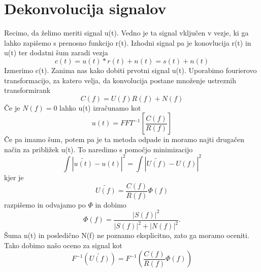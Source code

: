 \documentclass[11pt, a4paper]{article}
\begin{document}
\section{Dekonvolucija signalov}
Recimo, da želimo meriti signal u(t). Vedno je ta signal vključen v vezje, ki ga lahko zapišemo s prenosno funkcijo r(t). Izhodni signal pa je konovlucija r(t) in u(t) ter dodatni šum zaradi vezja
\begin{equation}
c(t) = u(t) * r(t) + n(t) = s(t) + n(t)
\end{equation}
Izmerimo c(t). Zanima nas kako dobiti prvotni signal u(t). Uporabimo fourierovo transformacijo, za katero velja, da konvolucija postane množenje ustreznih transformirank
\begin{equation}
C(f) = U(f) R(f) + N(f)
\end{equation}
Če je $N(f) = 0$ lahko u(t) izračunamo kot
\begin{equation}
u(t) = FFT^{-1} [\frac{C(f)}{R(f)}]
\end{equation}
Če pa imamo šum, potem pa je ta metoda odpade in moramo najti drugačen način za približek u(t). To naredimo s pomočjo minimizacijo
\begin{equation}
\int |\widetilde{u(t)} - u(t)|^2 = \int |\widetilde{U(f)} - U(f)|^2 
\end{equation}
kjer je 
\begin{equation}
\widetilde{U(f)} = \frac{C(f)}{R(f)} \Phi(f)
\end{equation}
razpišemo in odvajamo po $\Phi$ in dobimo
\begin{equation}
\Phi(f) = \frac{|S(f)|^2}{|S(f)|^2 + |N(f)|^2}.
\end{equation}
Šuma n(t) in posledično N(f) ne poznamo eksplicitno, zato ga moramo oceniti. Tako dobimo našo oceno za signal kot
\begin{equation}
F^{-1} (\widetilde{U(f)}) = F^{-1} (\frac{C(f)}{R(f)} \Phi(f))
\end{equation}
\end{document}

